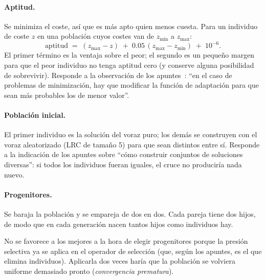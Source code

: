 \paragraph{Aptitud.} Se minimiza el coste, así que es más apto quien menos cuesta. Para un
individuo de coste $z$ en una población cuyos costes van de $z_{\min}$ a $z_{\max}$:
\[
   \text{aptitud} \;=\; (z_{\max}-z) \;+\; 0.05\,(z_{\max}-z_{\min}) \;+\; 10^{-6}.
\]
El primer término es la ventaja sobre el peor; el segundo es un pequeño margen para que el
peor individuo no tenga aptitud cero (y conserve alguna posibilidad de sobrevivir). Responde
a la observación de los apuntes~\cite{yanez}: ``en el caso de problemas de minimización, hay
que modificar la función de adaptación para que sean más probables los de menor valor''.

\paragraph{Población inicial.} El primer individuo es la solución del voraz puro; los demás
se construyen con el voraz aleatorizado (LRC de tamaño 5) para que sean distintos entre sí.
Responde a la indicación de los apuntes sobre ``cómo construir conjuntos de soluciones
diversas'': si todos los individuos fueran iguales, el cruce no produciría nada nuevo.

\paragraph{Progenitores.} Se baraja la población y se empareja de dos en dos. Cada pareja
tiene dos hijos, de modo que en cada generación nacen tantos hijos como individuos hay.

\begin{decision}
No se favorece a los mejores a la hora de elegir progenitores porque la presión selectiva ya
se aplica en el operador de selección (que, según los apuntes, es el que elimina individuos).
Aplicarla dos veces haría que la población se volviera uniforme demasiado pronto
(\emph{convergencia prematura}).
\end{decision}

